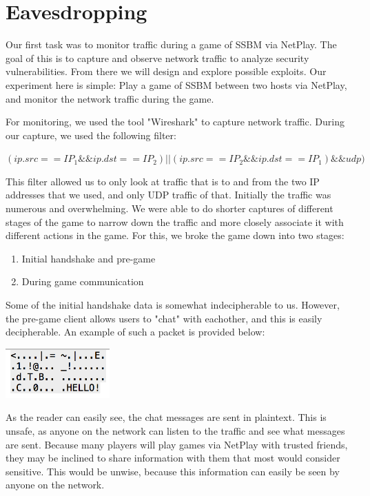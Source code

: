 \documentclass[conference]{IEEEtran}
\begin{document}
\section{Eavesdropping}
Our first task was to monitor traffic during a game of SSBM via NetPlay. 
The goal of this is to capture and observe network traffic to analyze security vulnerabilities. 
From there we will design and explore possible exploits.
Our experiment here is simple: Play a game of SSBM between two hosts via NetPlay, and monitor the network traffic during the game.

For monitoring, we used the tool "Wireshark" to capture network traffic. During our capture, we used the following filter:

$ ( ip.src == IP_1 \&\& ip.dst == IP_2 ) || (ip.src == IP_2 \&\& ip.dst == IP_1) \&\& udp) $

\vspace{0.3cm}
This filter allowed us to only look at traffic that is to and from the two IP addresses that we used, and only UDP traffic of that.
Initially the traffic was numerous and overwhelming.
We were able to do shorter captures of different stages of the game to narrow down the traffic and more closely associate it with different actions in the game.
For this, we broke the game down into two stages:
\begin{enumerate}  
\item Initial handshake and pre-game
\item During game communication
\end{enumerate}
\vspace{0.5cm}

Some of the initial handshake data is somewhat indecipherable to us. 
However, the pre-game client allows users to "chat" with eachother, and this is easily decipherable. 
An example of such a packet is provided below:
\vspace{0.5cm}
\begin{center}
\includegraphics[width=4cm]{Figures/Packet2}
\end{center}
\vspace{0.5cm}

As the reader can easily see, the chat messages are sent in plaintext.
This is unsafe, as anyone on the network can listen to the traffic and see what messages are sent.
Because many players will play games via NetPlay with trusted friends, they may be inclined to share information with them that most would consider sensitive.
This would be unwise, because this information can easily be seen by anyone on the network.
\end{document}
